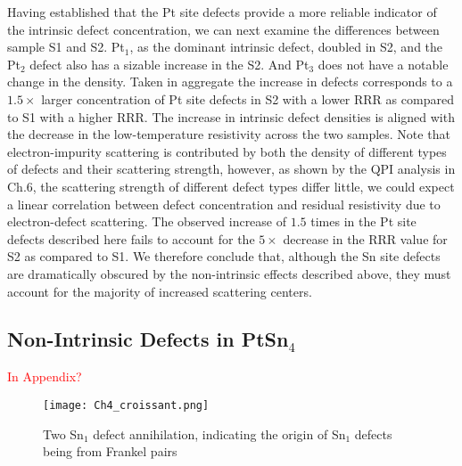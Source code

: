 \par Having established that the Pt site defects provide a more reliable indicator of the intrinsic defect concentration, we can next examine the differences between sample S1 and S2. Pt$_1$, as the dominant intrinsic defect, doubled in S2, and the Pt$_2$ defect also has a sizable increase in the S2. And Pt$_3$ does not have a notable change in the density. Taken in aggregate the increase in defects corresponds to a $1.5\times$ larger concentration of Pt site defects in S2 with a lower \ac{RRR} as compared to S1 with a higher \ac{RRR}.  The increase in intrinsic defect densities is aligned with the decrease in the low-temperature resistivity across the two samples. 
Note that electron-impurity scattering is contributed by both the density of different types of defects and their scattering strength, however, as shown by the \ac{QPI} analysis in Ch.6, the scattering strength of different defect types differ little, we could expect a linear correlation between defect concentration and residual resistivity due to electron-defect scattering. The observed increase of $1.5$ times in the Pt site defects described here fails to account for the $5\times$ decrease in the \ac{RRR} value for S2 as compared to S1. We therefore conclude that, although the Sn site defects are dramatically obscured by the non-intrinsic effects described above, they must account for the majority of increased scattering centers. 

\subsection{Non-Intrinsic Defects in PtSn$_4$} \textcolor{red}{In Appendix?}

\begin{figure}
	\centering
	\texttt{[image: Ch4\_croissant.png]}
	\caption{Two Sn$_1$ defect annihilation, indicating the origin of Sn$_1$ defects being from Frankel pairs}
	\label{fig:Ch4_croissantannihilation}
\end{figure}

